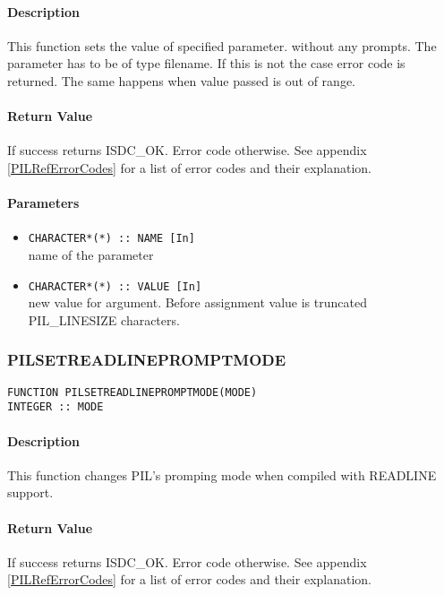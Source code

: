 \paragraph{Description\\}
This function sets the value of specified parameter. without any prompts.
The parameter has to be of type
filename. If this is not the case error code is returned. The same happens
when value passed is out of range. 

\paragraph{Return Value\\}
If success returns ISDC\_OK. Error code otherwise. See appendix \ref{PILRefErrorCodes}
for a list of error codes and their explanation.

\paragraph{Parameters}
\begin{itemize}
\item
{\tt CHARACTER*(*) :: NAME [In] } \\
name of the parameter 
\item
{\tt CHARACTER*(*) :: VALUE [In] } \\
new value for argument. Before assignment value is truncated PIL\_LINESIZE
characters.

\end{itemize}



\subsubsection{PILSETREADLINEPROMPTMODE}\label{PILSETREADLINEPROMPTMODE}

\begin{verbatim}
FUNCTION PILSETREADLINEPROMPTMODE(MODE)
INTEGER :: MODE
\end{verbatim}

\paragraph{Description\\}
This function changes PIL's promping mode when compiled
with READLINE support. 

\paragraph{Return Value\\}
If success returns ISDC\_OK. Error code otherwise. See appendix \ref{PILRefErrorCodes}
for a list of error codes and their explanation.

